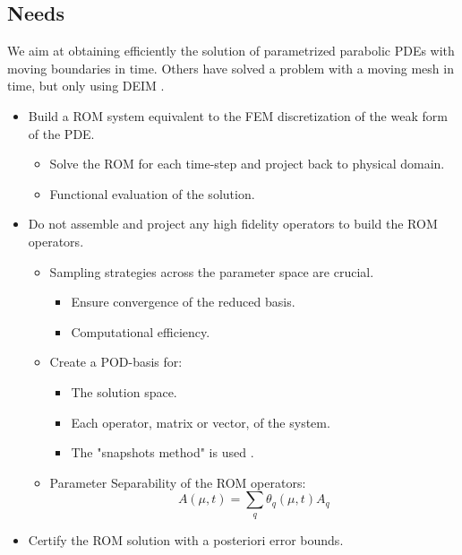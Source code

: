 \documentclass[thesis.tex]{subfiles}
\begin{document}
\subsection*{Needs}
We aim at obtaining efficiently the solution of parametrized parabolic PDEs with moving boundaries in time.
Others have solved a problem with a moving mesh in time, but only using DEIM \cite{2018_podDeimReducedOrderModelDeformingMeshAeroelasticApplications_Donfrancesco}.


\begin{itemize}
    \item Build a ROM system equivalent to the FEM discretization of the weak form of the PDE.
    \begin{itemize}
        \item Solve the ROM for each time-step and project back to physical domain.
        \item Functional evaluation of the solution.
    \end{itemize}
    \item Do not assemble and project any high fidelity operators to build the ROM operators.
    \begin{itemize}
        \item Sampling strategies across the parameter space are crucial.
            \begin{itemize}
                \item Ensure convergence of the reduced basis.
                \item Computational efficiency.
            \end{itemize}
        \item Create a POD-basis for:
        \begin{itemize}
            \item The solution space.
            \item Each operator, matrix or vector, of the system.
            \item The "snapshots method" is used \cite{1987_turbulenceDynamicsCoherentStructures_Sirovich, 2003_podBasedReducedOrderModelsWithDeformingGrids_anttonen}.
        \end{itemize}
        \item Parameter Separability of the ROM operators:
        \begin{equation*}
            A(\mu, t) = \sum_q \theta_q(\mu, t) A_q
        \end{equation*}
    \end{itemize}
    \item Certify the ROM solution with a posteriori error bounds.
\end{itemize}
\end{document}

